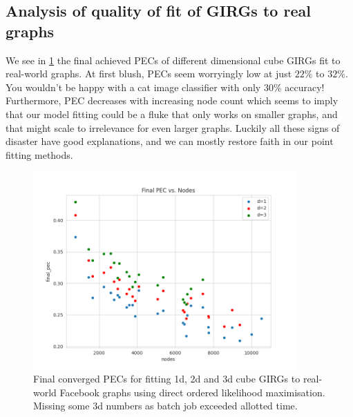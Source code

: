 \subsection{Analysis of quality of fit of GIRGs to real graphs}
We see in \cref{fig:converged_pecs} the final achieved PECs of different dimensional cube GIRGs fit to real-world graphs. At first blush, PECs seem worryingly low at just $22\%$ to $32\%$. You wouldn't be happy with a cat image classifier with only $30\%$ accuracy!
Furthermore, PEC decreases with increasing node count which seems to imply that our model fitting could be a fluke that only works on smaller graphs, and that might scale to irrelevance for even larger graphs.
Luckily all these signs of disaster have good explanations, and we can mostly restore faith in our point fitting methods.

\begin{figure}
  \centering
  \includegraphics[width=0.9\textwidth]{figures/mcmc_ordered_final_pec.png}
  \caption{Final converged PECs for fitting 1d, 2d and 3d cube GIRGs to real-world Facebook graphs using direct ordered likelihood maximisation.
  Missing some 3d numbers as batch job exceeded allotted time.}
  \label{fig:converged_pecs}
\end{figure}





